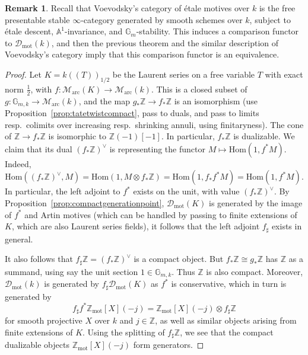 \documentclass[11pt]{amsart}
\numberwithin{equation}{section}
\numberwithin{theorem}{section}
\theoremstyle{definition}
\newtheorem{remark}[theorem]{Remark}
\begin{document}
\begin{remark} Recall that Voevodsky's category of \'etale motives over $k$ is the free presentable stable $\infty$-category generated by smooth schemes over $k$, subject to \'etale descent, $\mathbb A^1$-invariance, and $\mathbb G_m$-stability. This induces a comparison functor to $\mathcal D_{\mathrm{mot}}(k)$, and then the previous theorem and the similar description of Voevodsky's category imply that this comparison functor is an equivalence.
\end{remark}

\begin{proof} Let $K=k((T))_{1/2}$ be the Laurent series on a free variable $T$ with exact norm $\tfrac 12$, with $f: \mathcal M_{\mathrm{arc}}(K)\to \mathcal M_{\mathrm{arc}}(k)$. This is a closed subset of $g: \mathbb G_{m,k}\to \mathcal M_{\mathrm{arc}}(k)$, and the map $g_\ast \mathbb Z\to f_\ast \mathbb Z$ is an isomorphism (use Proposition~\ref{prop:tatetwistcompact}, pass to duals, and pass to limits resp.~colimits over increasing resp.~shrinking annuli, using finitaryness). The cone of $\mathbb Z\to f_\ast \mathbb Z$ is isomorphic to $\mathbb Z(-1)[-1]$. In particular, $f_\ast\mathbb Z$ is dualizable. We claim that its dual $(f_\ast \mathbb Z)^\vee$ is representing the functor $M\mapsto \mathrm{Hom}(1,f^\ast M)$. Indeed,
\[
\mathrm{Hom}((f_\ast \mathbb Z)^\vee,M) = \mathrm{Hom}(1,M\otimes f_\ast \mathbb Z) = \mathrm{Hom}(1,f_\ast f^\ast M)=\mathrm{Hom}(1,f^\ast M).
\]
In particular, the left adjoint to $f^\ast$ exists on the unit, with value $(f_\ast \mathbb Z)^\vee$. By Proposition~\ref{prop:compactgenerationpoint}, $\mathcal D_{\mathrm{mot}}(K)$ is generated by the image of $f^\ast$ and Artin motives (which can be handled by passing to finite extensions of $K$, which are also Laurent series fields), it follows that the left adjoint $f_\sharp$ exists in general.

It also follows that $f_\sharp \mathbb Z = (f_\ast \mathbb Z)^\vee$ is a compact object. But $f_\ast \mathbb Z\cong g_\ast \mathbb Z$ has $\mathbb Z$ as a summand, using say the unit section $1\in \mathbb G_{m,k}$. Thus $\mathbb Z$ is also compact. Moreover, $\mathcal D_{\mathrm{mot}}(k)$ is generated by $f_\sharp \mathcal D_{\mathrm{mot}}(K)$ as $f^\ast$ is conservative, which in turn is generated by
\[
f_\sharp f^\ast \mathbb Z_{\mathrm{mot}}[X](-j) = \mathbb Z_{\mathrm{mot}}[X](-j)\otimes f_\sharp \mathbb Z
\]
for smooth projective $X$ over $k$ and $j\in \mathbb Z$, as well as similar objects arising from finite extensions of $K$. Using the splitting of $f_\sharp \mathbb Z$, we see that the compact dualizable objects $\mathbb Z_{\mathrm{mot}}[X](-j)$ form generators.


\end{proof}
\end{document}
